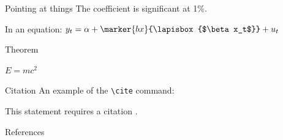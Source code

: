 \documentclass[aspectratio=169]{beamer}
\begin{document}
\begin{frame}{Pointing at things}
  \vspace{1.2cm}
  The coefficient  is significant at 1\%.

  \vspace{2cm}
  In an equation: $y_t = \alpha + \marker{bx}{\lapisbox{$\beta x_t$}} + u_t$
  \vspace{1cm}
\end{frame}

\begin{frame}{Theorem}
  \begin{theorem}
    $E = mc^2$
  \end{theorem}
\end{frame}

\begin{frame}[fragile]{Citation}
  An example of the \verb|\cite| command:

  \medskip
  This statement requires a citation \cite{p1}.
\end{frame}

\begin{frame}{References}
  \footnotesize
  
  
\end{frame}

\begin{frame}
  \vfill
  \vfill
\end{frame}
\end{document}
